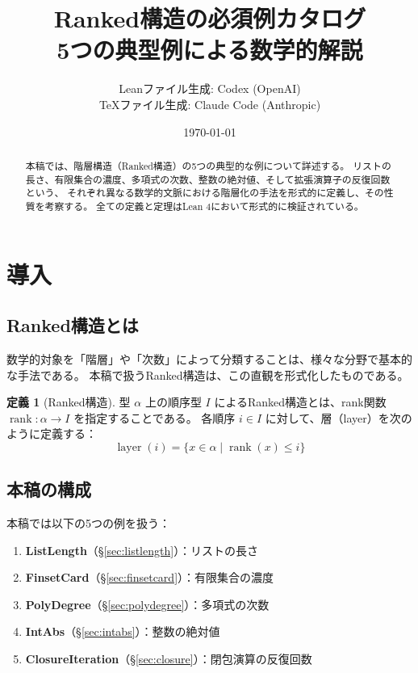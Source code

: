 \documentclass[a4paper,11pt]{ltjsarticle}
\title{Ranked構造の必須例カタログ\\
{\large 5つの典型例による数学的解説}}
\author{%
  Leanファイル生成: Codex (OpenAI)\\
  TeXファイル生成: Claude Code (Anthropic)
}
\date{\today}
\theoremstyle{definition}
\newtheorem{definition}{定義}[section]
\newcommand{\rank}{\operatorname{rank}}
\newcommand{\layer}{\operatorname{layer}}
\begin{document}
\maketitle

\begin{abstract}
本稿では、階層構造（Ranked構造）の5つの典型的な例について詳述する。
リストの長さ、有限集合の濃度、多項式の次数、整数の絶対値、そして拡張演算子の反復回数という、
それぞれ異なる数学的文脈における階層化の手法を形式的に定義し、その性質を考察する。
全ての定義と定理はLean 4において形式的に検証されている。
\end{abstract}

\tableofcontents

\section{導入}

\subsection{Ranked構造とは}

数学的対象を「階層」や「次数」によって分類することは、様々な分野で基本的な手法である。
本稿で扱うRanked構造は、この直観を形式化したものである。

\begin{definition}[Ranked構造]
\label{def:ranked}
型 $\alpha$ 上の順序型 $I$ によるRanked構造とは、rank関数 $\rank : \alpha \to I$ を指定することである。
各順序 $i \in I$ に対して、層（layer）を次のように定義する：
\[
\layer(i) = \{ x \in \alpha \mid \rank(x) \leq i \}
\]
\end{definition}

\subsection{本稿の構成}

本稿では以下の5つの例を扱う：

\begin{enumerate}
\item \textbf{ListLength}（\S\ref{sec:listlength}）：リストの長さ
\item \textbf{FinsetCard}（\S\ref{sec:finsetcard}）：有限集合の濃度
\item \textbf{PolyDegree}（\S\ref{sec:polydegree}）：多項式の次数
\item \textbf{IntAbs}（\S\ref{sec:intabs}）：整数の絶対値
\item \textbf{ClosureIteration}（\S\ref{sec:closure}）：閉包演算の反復回数
\end{enumerate}
\end{document}
